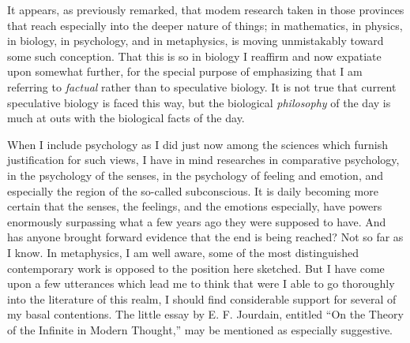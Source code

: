 \documentclass[a4paper, 11pt, oneside, polutonikogreek, english]{article}
\begin{document}
It appears, as previously remarked, that modem research taken in those provinces that reach especially into the deeper nature of things; in mathematics, in physics, in biology, in psychology, and in metaphysics, is moving unmistakably toward some such conception. That this is so in biology I reaffirm and now expatiate upon somewhat further, for the special purpose of emphasizing that I am referring to \emph{factual} rather than to speculative biology. It is not true that current speculative biology is faced this way, but the biological \emph{philosophy} of the day is much at outs with the biological facts of the day.

When I include psychology as I did just now among the sciences which furnish justification for such views, I have in mind researches in comparative psychology, in the psychology of the senses, in the psychology of feeling and emotion, and especially the region of the so-called subconscious. It is daily becoming more certain that the senses, the feelings, and the emotions especially, have powers enormously surpassing what a few years ago they were supposed to have. And has anyone brought forward evidence that the end is being reached? Not so far as I know. In metaphysics, I am well aware, some of the most distinguished contemporary work is opposed to the position here sketched. But I have come upon a few utterances which lead me to think that were I able to go thoroughly into the literature of this realm, I should find considerable support for several of my basal contentions. The little essay by E. F. Jourdain, entitled ``On the Theory of the Infinite in Modern Thought,'' may be mentioned as especially suggestive.

\subsection{}
\end{document}

